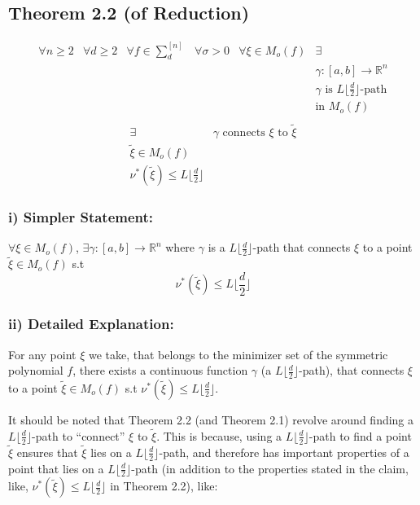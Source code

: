 \documentclass[12pt]{article}
\theoremstyle{definition}
\begin{document}
\subsection{Theorem 2.2 (of Reduction)}
\[
\begin{array}{cccccc}
\forall n \geq 2 & \forall d \geq 2 & \forall f \in \sum_d^{[n]} & \forall \sigma > 0 & \forall \xi \in M_o(f) & \exists \\
 & & & & & \gamma: [a,b] \to \mathbb{R}^n \\
 & & & & & \gamma \text{ is } L\lfloor \frac{d}{2} \rfloor\text{-path} \\
 & & & & & \text{in } M_o(f) \\
\end{array}
\]
\[
\begin{array}{cc}
\exists & \gamma \text{ connects } \xi \text{ to } \tilde{\xi}\\
\tilde{\xi} \in M_o(f) & \\
\nu^*(\tilde{\xi}) \leq L\lfloor \frac{d}{2} \rfloor & 
\end{array}
\]

\subsubsection*{i) Simpler Statement:}

$\forall \xi \in M_o(f)$, $\exists \gamma: [a,b] \to \mathbb{R}^n$ where $\gamma$ is a $L\lfloor \frac{d}{2} \rfloor$-path that connects $\xi$ to a point $\tilde{\xi} \in M_o(f)$ s.t
\[
\nu^*(\tilde{\xi}) \leq L\lfloor \frac{d}{2} \rfloor
\]

\subsubsection*{ii) Detailed Explanation:}

For any point $\xi$ we take, that belongs to the minimizer set of the symmetric polynomial $f$, there exists a continuous function $\gamma$ (a $L\lfloor \frac{d}{2} \rfloor$-path), that connects $\xi$ to a point $\tilde{\xi} \in M_o(f)$ s.t $\nu^*(\tilde{\xi}) \leq L\lfloor \frac{d}{2} \rfloor$.

It should be noted that Theorem 2.2 (and Theorem 2.1) revolve around finding a $L\lfloor \frac{d}{2} \rfloor$-path to ``connect'' $\xi$ to $\tilde{\xi}$. This is because, using a $L\lfloor \frac{d}{2} \rfloor$-path to find a point $\tilde{\xi}$ ensures that $\tilde{\xi}$ lies on a $L\lfloor \frac{d}{2} \rfloor$-path, and therefore has important properties of a point that lies on a $L\lfloor \frac{d}{2} \rfloor$-path (in addition to the properties stated in the claim, like, $\nu^*(\tilde{\xi}) \leq L\lfloor \frac{d}{2} \rfloor$ in Theorem 2.2), like:
\end{document}

